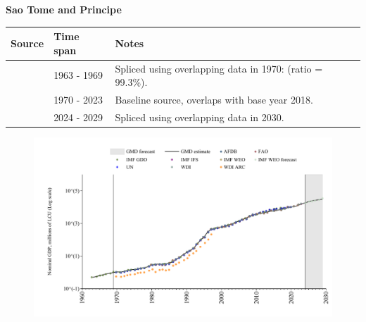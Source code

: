 \documentclass[12pt,a4paper,landscape]{article}
\begin{document}
\begin{adjustbox}{max totalsize={\paperwidth}{\paperheight},center}
\begin{minipage}[t][\textheight][t]{\textwidth}
\vspace*{0.5cm}
{}
\begin{center}
{\Large\bfseries Sao Tome and Principe}
\end{center}
\vspace{0.5cm}
\begin{table}[H]
\centering
\small
\begin{tabular}{|l|l|l|}
\hline
\textbf{Source} & \textbf{Time span} & \textbf{Notes} \\
\hline
\rowcolor{white}\cite{IMF_GDD}& 1963 - 1969 &Spliced using overlapping data in 1970: (ratio = 99.3\%).\\
\rowcolor{lightgray}\cite{WDI}& 1970 - 2023 &Baseline source, overlaps with base year 2018.\\
\rowcolor{white}\cite{IMF_WEO_forecast}& 2024 - 2029 &Spliced using overlapping data in 2030.\\
\hline
\end{tabular}
\end{table}
\begin{figure}[H]
\centering
\includegraphics[width=\textwidth,height=0.6\textheight,keepaspectratio]{graphs/STP_nGDP.pdf}
\end{figure}
\end{minipage}
\end{adjustbox}
\end{document}
